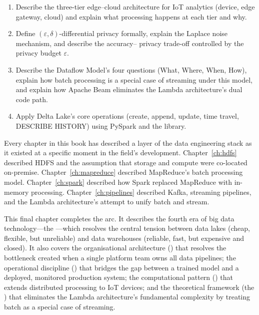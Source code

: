 \begin{chapterlearning}
\begin{enumerate}
        tracking, model registry, serving and monitoring), describe the
        tool used for each, and explain what ``hidden technical debt'' each
        component eliminates.
  \item Describe the three-tier edge--cloud architecture for IoT analytics
        (device, edge gateway, cloud) and explain what processing happens
        at each tier and why.
  \item Define $(\varepsilon, \delta)$-differential privacy formally,
        explain the Laplace noise mechanism, and describe the accuracy--
        privacy trade-off controlled by the privacy budget $\varepsilon$.
  \item Describe the Dataflow Model's four questions (What, Where, When,
        How), explain how batch processing is a special case of streaming
        under this model, and explain how Apache Beam eliminates the Lambda
        architecture's dual code path.
  \item Apply Delta Lake's core operations (create, append, update, time
        travel, DESCRIBE HISTORY) using PySpark and the 
        library.
\end{enumerate}
\end{chapterlearning}

\bigskip

Every chapter in this book has described a layer of the data engineering
stack as it existed at a specific moment in the field's development.
Chapter~\ref{ch:hdfs} described HDFS and the assumption that storage
and compute were co-located on-premise. Chapter~\ref{ch:mapreduce}
described MapReduce's batch processing model. Chapter~\ref{ch:spark}
described how Spark replaced MapReduce with in-memory processing.
Chapter~\ref{ch:pipelines} described Kafka, streaming pipelines, and the
Lambda architecture's attempt to unify batch and stream.

This final chapter completes the arc. It describes the fourth era of
big data technology---the ---which resolves the central
tension between data lakes (cheap, flexible, but unreliable) and data
warehouses (reliable, fast, but expensive and closed). It also covers
the organisational architecture () that resolves the
bottleneck created when a single platform team owns all data pipelines;
the operational discipline () that bridges the gap between
a trained model and a deployed, monitored production system; the
computational pattern () that extends distributed
processing to IoT devices; and the theoretical framework
(the ) that eliminates the Lambda architecture's
fundamental complexity by treating batch as a special case of streaming.

